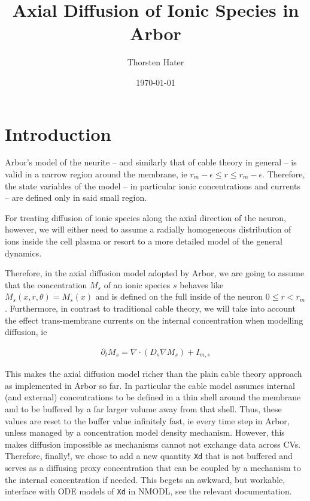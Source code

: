 \documentclass[a4paper]{article}
\author{Thorsten Hater}
\date{\today}
\title{Axial Diffusion of Ionic Species in Arbor}
\begin{document}
\maketitle
\tableofcontents


\section{Introduction}
\label{sec:org8cd0584}

Arbor's model of the neurite -- and similarly that of cable theory in general --
is valid in a narrow region around the membrane, ie \(r_{m} - \epsilon \leq r
\leq r_{m} - \epsilon\). Therefore, the state variables of the model -- in
particular ionic concentrations and currents -- are defined only in said small
region.

For treating diffusion of ionic species along the axial direction of the neuron,
however, we will either need to assume a radially homogeneous distribution of
ions inside the cell plasma or resort to a more detailed model of the general
dynamics.

Therefore, in the axial diffusion model adopted by Arbor, we are going to assume
that the concentration \(M_s\) of an ionic species \(s\) behaves like \(M_s(x, r,
\theta) = M_s(x)\) and is defined on the full inside of the neuron \(0 \leq r <
r_m\). Furthermore, in contrast to traditional cable theory, we will take into
account the effect trans-membrane currents on the internal concentration when
modelling diffusion, ie

\begin{align*}
\partial_{t} M_{s} = \nabla \cdot (D_{s} \nabla M_{s}) + I_{m,s}
\end{align*}

This makes the axial diffusion model richer than the plain cable theory approach
as implemented in Arbor so far. In particular the cable model assumes internal
(and external) concentrations to be defined in a thin shell around the membrane
and to be buffered by a far larger volume away from that shell. Thus, these
values are reset to the buffer value infinitely fast, ie every time step in
Arbor, unless managed by a concentration model density mechanism. However, this
makes diffusion impossible as mechanisms cannot not exchange data across CVs.
Therefore, finally!, we chose to add a new quantity \texttt{Xd} that is not buffered
and serves as a diffusing proxy concentration that can be coupled by a mechanism
to the internal concentration if needed. This begets an awkward, but workable,
interface with ODE models of \texttt{Xd} in NMODL, see the relevant documentation.
\end{document}
